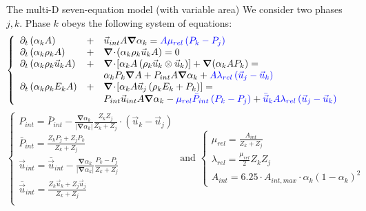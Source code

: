 \documentclass[xcolor=dvipsnames,10pt]{beamer}
\renewcommand{\div}{\boldsymbol{\nabla}\! \cdot \!}
\newcommand{\grad}{\boldsymbol{\nabla}}
\begin{document}
\begin{frame}{The multi-D seven-equation model (with variable area)}
We consider two phases ${j,k}$. Phase $k$ obeys the following system of equations:
\begin{equation}
\left\{
\begin{array}{lcll}
\partial_t \left( \alpha_k  A\right) &+& \vec{u}_{int} A \grad \alpha_k = {\color{blue}A \mu_{rel} \left( P_k - P_j \right)}& \nonumber \\
\partial_t \left( \alpha_k \rho_k A \right) &+& \div \left( \alpha_k \rho_k \vec{u}_k A \right) = 0& \nonumber \\
\partial_t \left( \alpha_k \rho_k \vec{u}_k A \right) &+& \div \left[ \alpha_k A \left( \rho_k \vec{u}_k\otimes \vec{u}_k \right) \right]  + \grad(\alpha_k A P_k) =  \nonumber \\
&&\alpha_k P_k \grad A +  P_{int} A \grad \alpha_k +  {\color{blue}A \lambda_{rel} \left( \vec{u}_j - \vec{u}_k \right)} &\nonumber \\
\partial_t \left( \alpha_k \rho_k E_k A \right) &+& \div \left[ \alpha_k A \vec{u}_j \left( \rho_k E_k + P_k \right) \right] =& \\
&&P_{int} \vec{u}_{int} A \grad \alpha_k - {\color{blue}\mu_{rel} \bar{P}_{int} \left( P_k-P_j \right)} +{\color{blue}\bar{\vec{u}}_kA \lambda_{rel} \left( \vec{u}_j - \vec{u}_k \right)}& \nonumber
\end{array}
\right.
\end{equation}
\begin{equation}
\left\{
\begin{array}{l}
P_{int} = \bar{P}_{int} - \frac{\grad \alpha_k}{|\grad \alpha_k|} \frac{Z_k Z_j}{Z_k + Z_j} \cdot \left( \vec{u}_k-\vec{u}_j \right) \\
\bar{P}_{int} = \frac{Z_k P_j + Z_j P_k}{Z_k + Z_j} \\
\vec{u}_{int} = \bar{\vec{u}}_{int} - \frac{\grad \alpha_k}{|\grad \alpha_k|} \frac{P_k - P_j}{Z_k + Z_j} \\
\bar{\vec{u}}_{int} = \frac{Z_k \vec{u} _k + Z_j \vec{u}_j}{Z_k + Z_j} \\
\end{array}
\right.
\nonumber
\text{ and }
\left\{
\begin{array}{l}
\mu_{rel} = \frac{A_{int}}{Z_k+Z_j} \\
\lambda_{rel} = \frac{\mu_{rel}}{2} Z_k Z_j \\
A_{int} = 6.25 \cdot A_{int,max} \cdot \alpha_k \left( 1-\alpha_k \right)^2
\end{array}
\right.
\end{equation}
\end{frame}
\end{document}
